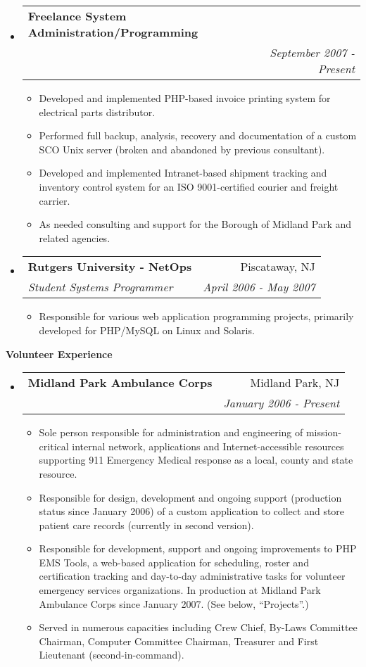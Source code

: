 \documentclass[letterpaper,11pt]{article}
\makeatletter
\newcommand{\resitem}[1]{\item #1 \vspace{-2pt}}
\newcommand{\resheading}[1]{{\large \colorbox{mygrey}{\begin{minipage}{\textwidth}{\textbf{#1 \vphantom{p\^{E}}}}\end{minipage}}}}
\newcommand{\ressubheading}[4]{
\begin{tabular*}{7.0in}{l@{\extracolsep{\fill}}r}
		\textbf{#1} & #2 \\
		\textit{#3} & \textit{#4} \\
\end{tabular*}\vspace{-6pt}}
\makeatother
\begin{document}
\begin{itemize}
\item
        \ressubheading{Freelance System Administration/Programming}{ }{ }{September 2007 - Present}
        \begin{itemize}
               \resitem{Developed and implemented PHP-based invoice printing
                 system for electrical parts distributor.}
               \resitem{Performed full backup, analysis, recovery and documentation of a
                 custom SCO Unix server (broken and abandoned by previous consultant).}
               \resitem{Developed and implemented Intranet-based shipment tracking and
                 inventory control system for an ISO 9001-certified courier
                 and freight carrier.}
               \resitem{As needed consulting and support for the Borough of
                 Midland Park and related agencies.}
        \end{itemize}

\item
	\ressubheading{Rutgers University - NetOps}{Piscataway, NJ}{Student Systems Programmer}{April 2006 - May 2007}
	\begin{itemize}
		\resitem{Responsible for various web application programming projects, primarily developed for
                  PHP/MySQL on Linux and Solaris.}
	\end{itemize}

\end{itemize}

\pagebreak

\resheading{Volunteer Experience}
\begin{itemize}
\item
        \ressubheading{Midland Park Ambulance Corps}{Midland Park, NJ}{}{January 2006 - Present}
        \begin{itemize}
                \resitem{Sole person responsible for administration and engineering of
                  mission-critical internal network, applications and
                  Internet-accessible resources supporting 911 Emergency
                  Medical response as a local, county and state resource.}
                \resitem{Responsible for design, development and ongoing support (production
                  status since January 2006) of a custom application to
                  collect and store patient care records (currently in second version).}
                \resitem{Responsible for development, support and ongoing
                  improvements to PHP EMS Tools, a web-based application for
                  scheduling, roster and certification tracking and day-to-day
                administrative tasks for volunteer emergency services
                organizations. In production at Midland Park Ambulance Corps
                since January 2007. (See below, ``Projects''.)}
                \resitem{Served in numerous capacities including Crew Chief,
                  By-Laws Committee Chairman, Computer Committee Chairman,
                  Treasurer and First Lieutenant (second-in-command).}
        \end{itemize}
\end{itemize}
\end{document}

